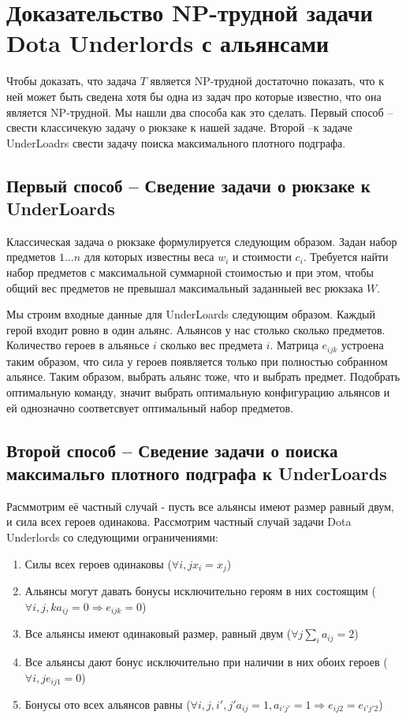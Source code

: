 \documentclass{article}
\begin{document}
\section{Доказательство NP-трудной задачи Dota Underlords с альянсами}

Чтобы доказать, что задача $T$ является NP-трудной достаточно показать, что  к ней может быть сведена хотя бы одна из задач про которые известно, что она является NP-трудной.  Мы нашли два способа как это сделать. Первый способ – свести классичекую задачу о рюкзаке к нашей задаче. Второй –к задаче UnderLoadrs  свести задачу поиска максимального плотного подграфа. 


\subsection{Первый способ – Сведение задачи о рюкзаке к UnderLoards}

Классическая задача о рюкзаке формулируется следующим образом. Задан набор предметов $1...n$ для которых известны веса $w_i$ и стоимости $c_i$. Требуется найти набор предметов с максимальной суммарной стоимостью и при этом, чтобы общий вес предметов не превышал максимальный заданныей вес рюкзака $W$.

Мы строим входные данные для UnderLoards следующим образом. 
Каждый герой входит ровно в один альянс. Альянсов у нас столько сколько предметов. Количество героев в альяньсе $i$  сколько вес предмета $i$. Матрица $e_{ijk}$ устроена таким образом, что сила у героев появляется только при полностью собранном альянсе. Таким образом, выбрать альянс тоже, что и выбрать предмет. Подобрать оптимальную команду, значит выбрать оптимальную конфигурацию альянсов и ей однозначно соответсвует оптимальный набор предметов.

\subsection{Второй способ – Сведение задачи о поиска максимальго плотного подграфа к UnderLoards}

Расммотрим её частный случай - пусть все альянсы имеют размер равный двум, и сила всех героев одинакова. Рассмотрим частный случай задачи Dota Underlords со следующими ограничениями:

\begin{enumerate}
    \item Силы всех героев одинаковы ($\forall i, j x_i=x_j$)
    \item Альянсы могут давать бонусы исключительно героям в них состоящим ($\forall i, j, k a_{ij}=0 \Longrightarrow e_{ijk} = 0$)
    \item Все альянсы имеют одинаковый размер, равный двум ($\forall j \sum_i a_{ij}=2$)
    \item Все альянсы дают бонус исключительно при наличии в них обоих героев ($\forall i, j e_{ij1}=0$)
    \item Бонусы ото всех альянсов равны ($\forall i, j, i', j' a_{ij}=1, a_{i' j'}=1 \Longrightarrow e_{ij2}=e_{i' j' 2}$)
\end{enumerate}
\end{document}
